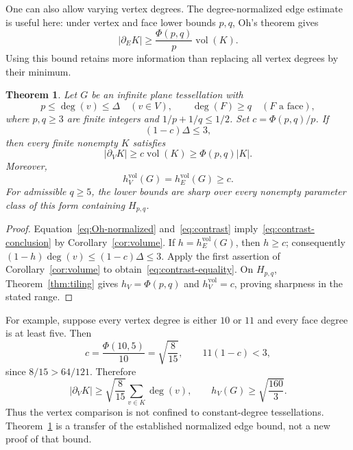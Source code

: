 \documentclass[11pt]{amsart}
\numberwithin{equation}{section}
\newtheorem{theorem}{Theorem}[section]
\theoremstyle{definition}
\theoremstyle{remark}
\newcommand{\hE}{h_E}
\newcommand{\hV}{h_V}
\newcommand{\bE}{\partial_E}
\newcommand{\bV}{\partial_V}
\newcommand{\vol}{\operatorname{vol}}
\begin{document}
One can also allow varying vertex degrees. The degree-normalized edge estimate is useful here: under vertex and face lower bounds $p,q$, Oh's theorem gives
\begin{equation}\label{eq:Oh-normalized}
|\bE K|\ge \frac{\Phi(p,q)}p\vol(K).
\end{equation}
Using this bound retains more information than replacing all vertex degrees by their minimum.

\begin{theorem}\label{thm:degree-contrast}
Let $G$ be an infinite plane tessellation with
\[
p\le\deg(v)\le\Delta\quad(v\in V),\qquad
\deg(F)\ge q\quad(F\text{ a face}),
\]
where $p,q\ge3$ are finite integers and $1/p+1/q\le1/2$. Set $c=\Phi(p,q)/p$. If
\begin{equation}\label{eq:contrast}
(1-c)\Delta\le3,
\end{equation}
then every finite nonempty $K$ satisfies
\begin{equation}\label{eq:contrast-conclusion}
|\bV K|\ge c\vol(K)\ge\Phi(p,q)|K|.
\end{equation}
Moreover,
\begin{equation}\label{eq:contrast-equality}
\hV^{\mathrm{vol}}(G)=\hE^{\mathrm{vol}}(G)\ge c.
\end{equation}
For admissible $q\ge5$, the lower bounds are sharp over every nonempty parameter class of this form containing $H_{p,q}$.
\end{theorem}
\begin{proof}
Equation~\eqref{eq:Oh-normalized} and~\eqref{eq:contrast} imply~\eqref{eq:contrast-conclusion} by Corollary~\ref{cor:volume}. If $h=\hE^{\mathrm{vol}}(G)$, then $h\ge c$; consequently $(1-h)\deg(v)\le(1-c)\Delta\le3$. Apply the first assertion of Corollary~\ref{cor:volume} to obtain~\eqref{eq:contrast-equality}. On $H_{p,q}$, Theorem~\ref{thm:tiling} gives $\hV=\Phi(p,q)$ and $\hV^{\mathrm{vol}}=c$, proving sharpness in the stated range.
\end{proof}

For example, suppose every vertex degree is either $10$ or $11$ and every face degree is at least five. Then
\[
c=\frac{\Phi(10,5)}{10}=\sqrt{\frac8{15}},\qquad
11(1-c)<3,
\]
since $8/15>64/121$. Therefore
\[
|\bV K|\ge\sqrt{\frac8{15}}\sum_{v\in K}\deg(v),\qquad
\hV(G)\ge\sqrt{\frac{160}{3}}.
\]
Thus the vertex comparison is not confined to constant-degree tessellations. Theorem~\ref{thm:degree-contrast} is a transfer of the established normalized edge bound, not a new proof of that bound.
\end{document}
